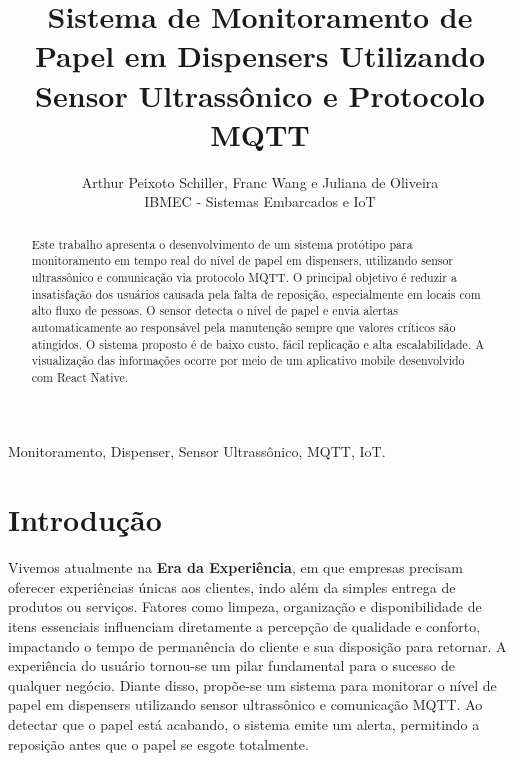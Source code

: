 \documentclass[english,hidelinks]{sbrt}
\begin{document}
\title{Sistema de Monitoramento de Papel em Dispensers Utilizando Sensor Ultrassônico e Protocolo MQTT}
\author{Arthur Peixoto Schiller, Franc Wang e Juliana de Oliveira\\IBMEC - Sistemas Embarcados e IoT}
\maketitle


\begin{abstract}
Este trabalho apresenta o desenvolvimento de um sistema protótipo para monitoramento em tempo real do nível de papel em dispensers, utilizando sensor ultrassônico e comunicação via protocolo MQTT. O principal objetivo é reduzir a insatisfação dos usuários causada pela falta de reposição, especialmente em locais com alto fluxo de pessoas. O sensor detecta o nível de papel e envia alertas automaticamente ao responsável pela manutenção sempre que valores críticos são atingidos. O sistema proposto é de baixo custo, fácil replicação e alta escalabilidade. A visualização das informações ocorre por meio de um aplicativo mobile desenvolvido com React Native.
\end{abstract}
\begin{keywords}
Monitoramento, Dispenser, Sensor Ultrassônico, MQTT, IoT.
\end{keywords}

\section{Introdução}
Vivemos atualmente na \textbf{Era da Experiência}, em que empresas precisam oferecer experiências únicas aos clientes, indo além da simples entrega de produtos ou serviços. Fatores como limpeza, organização e disponibilidade de itens essenciais influenciam diretamente a percepção de qualidade e conforto, impactando o tempo de permanência do cliente e sua disposição para retornar. A experiência do usuário tornou-se um pilar fundamental para o sucesso de qualquer negócio. Diante disso, propõe-se um sistema para monitorar o nível de papel em dispensers utilizando sensor ultrassônico e comunicação MQTT. Ao detectar que o papel está acabando, o sistema emite um alerta, permitindo a reposição antes que o papel se esgote totalmente.
\end{document}
